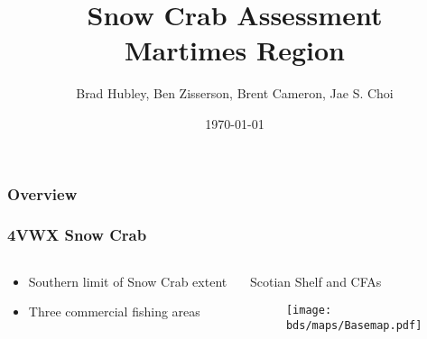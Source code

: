 \documentclass{beamer}
\title{Snow Crab Assessment \\
  Martimes Region \\
  \yr }
\author{Brad Hubley, Ben Zisserson, Brent Cameron, Jae S. Choi} %
\institute[DFO] %
{
  Department of Fisheries and Oceans \\ %
  Science Branch \\
  Population Ecology Division
  \medskip
  \textit{} %
}
\date{\today} %
\numberwithin{equation}{section}		%
\numberwithin{figure}{section}		%
\numberwithin{table}{section}				%
\newcommand{\bd}{\string~/bio.data}   %
\newcommand{\bds}{\bd/bio.snowcrab}
\begin{document}
  
  
  \begin{frame}
    \titlepage %
  \end{frame}
  
  \begin{frame}
    \frametitle{Overview} %
    \tableofcontents %
  \end{frame}
  
  
  
  
  \begin{frame}
    \frametitle{4VWX Snow Crab}
    \begin{columns}[T]
      \begin{column}{0.4\textwidth}
        \begin{itemize}
          \item Southern limit of Snow Crab extent
          \item Three commercial fishing areas
        \end{itemize}
      \end{column}
      
      \begin{column}{0.6\textwidth}
        \begin{centering}
          Scotian Shelf and CFAs
          \begin{figure}
            \texttt{[image: \\bds/maps/Basemap.pdf]}
          \end{figure}
        \end{centering}
      \end{column}
    \end{columns}
  \end{frame}
  
\end{document}
